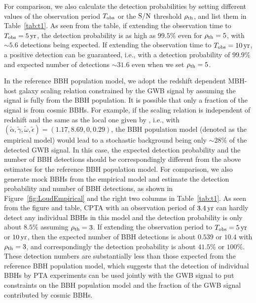 \documentclass[twocolumn]{aastex631}
\newcommand{\talpha}{{\tilde{\alpha}}}
\newcommand{\tgamma}{{\tilde{\gamma}}}
\newcommand{\tomega}{{\tilde{\omega}}}
\newcommand{\tepsilon}{{\tilde{\epsilon}}}
\newcommand{\obs}{_{\rm obs}}
\newcommand{\snr}{{\rm S/N}}
\newcommand{\rhoth}{{\rho_{\rm th}}}
\newcommand{\yr}{{\rm\,yr}}
\begin{document}
For comparison, we also calculate the detection probabilities by setting
different values of the observation period $T\obs$ or the $\snr$ threshold
$\rhoth$, and list them in Table~\ref{tab:t1}. As seen from the table, if
extending the observation time to $T\obs=5\yr$, the detection probability is as
high as $99.5\%$ even for $\rhoth=5$, with $\sim 5.6$ detections being expected.
If extending the observation time to $T\obs=10\yr$, a positive detection can be
guaranteed, i.e., with a detection probability of $99.9\%$ and expected number
of detections $\sim 31.6$ even when we set $\rhoth=5$. 
 
In the reference BBH population model, we adopt the redshift dependent MBH-host
galaxy scaling relation constrained by the GWB signal by assuming the signal is
fully from the BBH population. It is possible that only a fraction of the signal
is from cosmic BBHs. For example, if the scaling relation is independent of
redshift and the same as the local one given by \citet{KH13}, i.e., with
$(\talpha,\tgamma,\tomega,\tepsilon)=(1.17,8.69,0,0.29)$, the BBH population
model (denoted as the empirical model) would lead to a stochastic background
being only $\sim 28\%$ of the detected GWB signal. In this case, the expected
detection probability and the number of BBH detections should be correspondingly
different from the above estimates for the reference BBH population model. For
comparison, we also generate mock BBHs from the empirical model and estimate the
detection probability and number of BBH detections, as shown in
Figure~\ref{fig:LoudEmpirical} and the right two columns in Table~\ref{tab:t1}.
As seen from the figure and table, CPTA with an observation period of $3.4\yr$
can hardly detect any individual BBHs in this model and the detection
probability is only about $8.5\%$ assuming $\rhoth=3$. If extending the
observation period to $T\obs=5\yr$ or $10\yr$, then the expected number of BBH
detections is about $0.539$ or $10.4$ with $\rhoth=3$, and correspondingly the
detection probability is about $41.5$\% or $100\%$. These detection numbers are
substantially less than those expected from the reference BBH population model,
which suggests that the detection of individual BBHs by PTA experiments can be
used jointly with the GWB signal to put constraints on the BBH population model
and the fraction of the GWB signal contributed by cosmic BBHs. 
\end{document}
